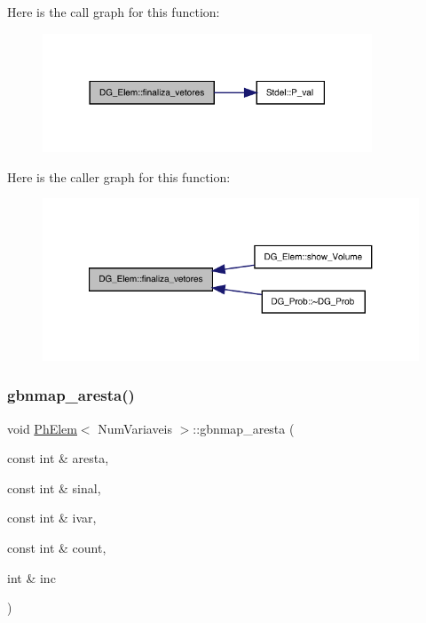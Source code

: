 Here is the call graph for this function\+:
\nopagebreak
\begin{figure}[H]
\begin{center}
\leavevmode
\includegraphics[width=278pt]{classDG__Elem_af91d2d61c97fae30b8dfc6db67433094_cgraph}
\end{center}
\end{figure}
Here is the caller graph for this function\+:
\nopagebreak
\begin{figure}[H]
\begin{center}
\leavevmode
\includegraphics[width=321pt]{classDG__Elem_af91d2d61c97fae30b8dfc6db67433094_icgraph}
\end{center}
\end{figure}
\mbox{\label{classPhElem_a19299ae55f9faef322a1d21d7e9b2a88}} 
\subsubsection{\texorpdfstring{gbnmap\+\_\+aresta()}{gbnmap\_aresta()}}
{\footnotesize\ttfamily void \hyperlink{classPhElem}{Ph\+Elem}$<$ Num\+Variaveis $>$\+::gbnmap\+\_\+aresta (\begin{DoxyParamCaption}\item[{const int \&}]{aresta,  }\item[{const int \&}]{sinal,  }\item[{const int \&}]{ivar,  }\item[{const int \&}]{count,  }\item[{int \&}]{inc }\end{DoxyParamCaption})\hspace{0.3cm}{\ttfamily [inherited]}}



